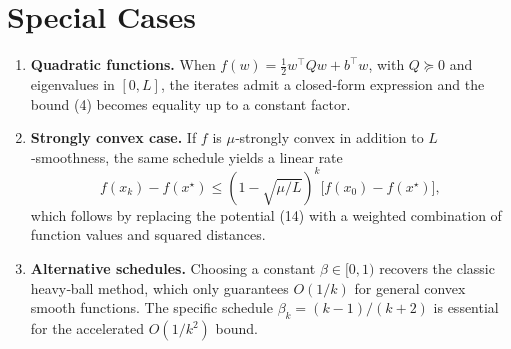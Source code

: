 \documentclass{article}
\begin{document}
\section*{Special Cases}
\begin{enumerate}[label=\alph*)]
\item \textbf{Quadratic functions.} When $f(w)=\tfrac12 w^{\top}Q w+b^{\top}w$, with $Q\succeq 0$ and eigenvalues in $[0,L]$, the iterates admit a closed‑form expression and the bound (4) becomes equality up to a constant factor.
\item \textbf{Strongly convex case.} If $f$ is $\mu$‑strongly convex in addition to $L$‑smoothness, the same schedule yields a linear rate
\[
f(x_k)-f(x^{\star})\le \left(1-\sqrt{\mu/L}\right)^{k}\bigl[f(x_0)-f(x^{\star})\bigr],
\]
which follows by replacing the potential (14) with a weighted combination of function values and squared distances.
\item \textbf{Alternative schedules.} Choosing a constant $\beta\in[0,1)$ recovers the classic heavy‑ball method, which only guarantees $O(1/k)$ for general convex smooth functions. The specific schedule $\beta_k=(k-1)/(k+2)$ is essential for the accelerated $O(1/k^{2})$ bound.
\end{enumerate}
\end{document}
